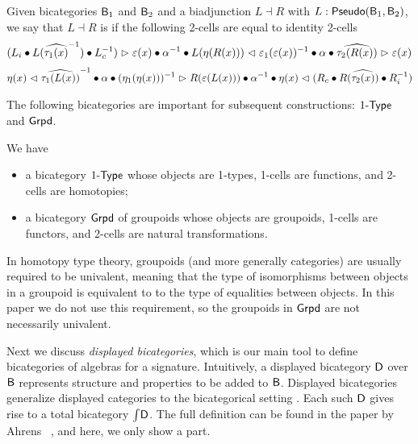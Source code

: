 \begin{definition}
Given bicategories $\mathsf{B}_1$ and $\mathsf{B}_2$ and a biadjunction $L \dashv R$ with $L : \mathsf{Pseudo}(\mathsf{B}_1, \mathsf{B}_2)$, we say that $L \dashv R$ is  if the following 2-cells are equal to identity 2-cells
\begin{equation*}
\begin{split}
({L}_i \bullet L(\widehat{\tau_1(x)}^{-1}) \bullet {L}_c^{-1}) \vartriangleright \varepsilon(x)
\bullet \alpha^{-1}
\bullet L(\eta(R(x))) \vartriangleleft \varepsilon_1(\varepsilon(x))^{-1}
\bullet \alpha
\bullet \widehat{\tau_2(R(x))} \vartriangleright \varepsilon(x)
\end{split}
\end{equation*}
\begin{equation*}
\begin{split}
\eta(x) \vartriangleleft \widehat{\tau_1(L(x))}^{-1}
\bullet \alpha
\bullet (\eta_1(\eta(x)))^{-1} \vartriangleright R(\varepsilon(L(x)))
\bullet \alpha^{-1}
\bullet \eta(x) \vartriangleleft ({R}_c \bullet R(\widehat{\tau_2(x)}) \bullet {R}_i^{-1})
\end{split}
\end{equation*}
\end{definition}

The following bicategories are important for subsequent constructions:
$1\mbox{-}\mathsf{Type}$ and $\mathsf{Grpd}$.

\begin{example}
We have
\begin{itemize}
	\item a bicategory $1\mbox{-}\mathsf{Type}$ whose objects are 1-types, 1-cells are functions, and 2-cells are homotopies;
	\item a bicategory $\mathsf{Grpd}$ of groupoids
	whose objects are groupoids, 1-cells are functors, and 2-cells are natural transformations.
\end{itemize}
\end{example}
In homotopy type theory, groupoids (and more generally categories) are
usually required to be univalent, meaning that the type of isomorphisms between objects
in a groupoid is equivalent to to the type of equalities between objects. In this paper we
do not use this requirement, so the groupoids in $\mathsf{Grpd}$ are not
necessarily univalent.


Next we discuss \emph{displayed bicategories}, which is our main tool to define bicategories of algebras for a signature.
Intuitively, a displayed bicategory $\mathsf{D}$ over $\mathsf{B}$ represents structure and properties to be added to $\mathsf{B}$.
Displayed bicategories generalize displayed categories to the bicategorical setting \cite{AhrensL19}.
Each such $\mathsf{D}$ gives rise to a total bicategory $\textstyle \int_{}{\mathsf{D}}$.
The full definition can be found in the paper by Ahrens \etal \ \cite{bicatjournal}, and here, we only show a part.

